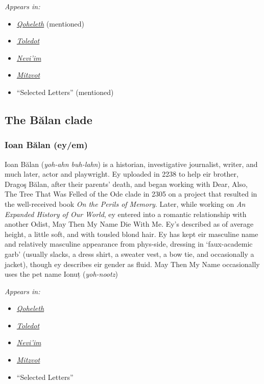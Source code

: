 \emph{Appears in:}

\begin{itemize}
\tightlist
\item
  \href{https://qoheleth.post-self.ink}{\emph{Qoheleth}} (mentioned)
\item
  \href{https://toledot.post-self.ink}{\emph{Toledot}}
\item
  \href{https://neviim.post-self.ink}{\emph{Nevi'im}}
\item
  \href{https://mitzvot.post-self.ink}{\emph{Mitzvot}}
\item
  ``Selected Letters'' (mentioned)
\end{itemize}

\subsection{The Bălan clade}

\subsubsection{Ioan Bălan (ey/em)}

Ioan Bălan (\emph{yoh-ahn buh-lahn}) is a historian, investigative journalist, writer, and much later, actor and playwright. Ey uploaded in 2238 to help eir brother, Dragoş Bălan, after their parents' death, and began working with Dear, Also, The Tree That Was Felled of the Ode clade in 2305 on a project that resulted in the well-received book \emph{On the Perils of Memory}. Later, while working on \emph{An Expanded History of Our World}, ey entered into a romantic relationship with another Odist, May Then My Name Die With Me. Ey's described as of average height, a little soft, and with tousled blond hair. Ey has kept eir masculine name and relatively masculine appearance from phys-side, dressing in `faux-academic garb' (usually slacks, a dress shirt, a sweater vest, a bow tie, and occasionally a jacket), though ey describes eir gender as fluid. May Then My Name occasionally uses the pet name Ionuț (\emph{yoh-nootz})




\emph{Appears in:}

\begin{itemize}
\tightlist
\item
  \href{https://qoheleth.post-self.ink}{\emph{Qoheleth}}
\item
  \href{https://toledot.post-self.ink}{\emph{Toledot}}
\item
  \href{https://neviim.post-self.ink}{\emph{Nevi'im}}
\item
  \href{https://mitzvot.post-self.ink}{\emph{Mitzvot}}
\item
  ``Selected Letters''
\end{itemize}

